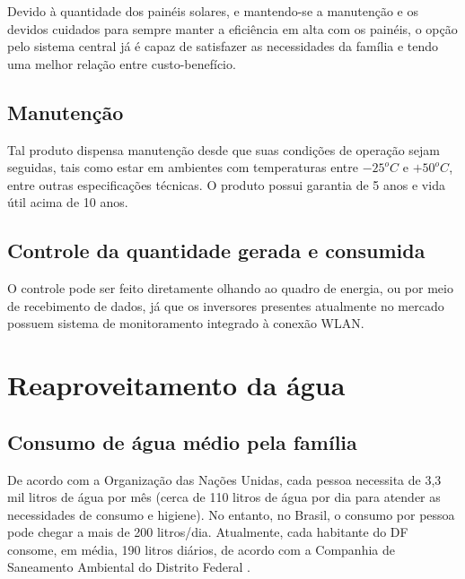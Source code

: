 	Devido à quantidade dos painéis solares, e mantendo-se a manutenção e os devidos cuidados para sempre manter a eficiência em alta com os painéis, o opção pelo sistema central já é capaz de satisfazer as necessidades da família e tendo uma melhor relação entre custo-benefício.

\subsection{Manutenção}

	Tal produto dispensa manutenção desde que suas condições de operação sejam seguidas, tais como estar em ambientes com temperaturas entre $-25^oC$ e $+50^oC$, entre outras especificações técnicas. O produto possui garantia de 5 anos e vida útil acima de 10 anos.


\subsection{Controle da quantidade gerada e consumida}

	O controle pode ser feito diretamente olhando ao quadro de energia, ou por meio de recebimento de dados, já que os inversores presentes atualmente no mercado possuem sistema de monitoramento integrado à conexão WLAN.


\section{Reaproveitamento da água}

\subsection{Consumo de água médio pela família}

	De acordo com a Organização das Nações Unidas, cada pessoa necessita de 3,3 mil litros de água por mês (cerca de 110 litros de água por dia para atender as necessidades de consumo e higiene). No entanto, no Brasil, o consumo por pessoa pode chegar a mais de 200 litros/dia. Atualmente, cada habitante do DF consome, em média, 190 litros diários, de acordo com a Companhia de Saneamento Ambiental do Distrito Federal \cite{CAESB}.

